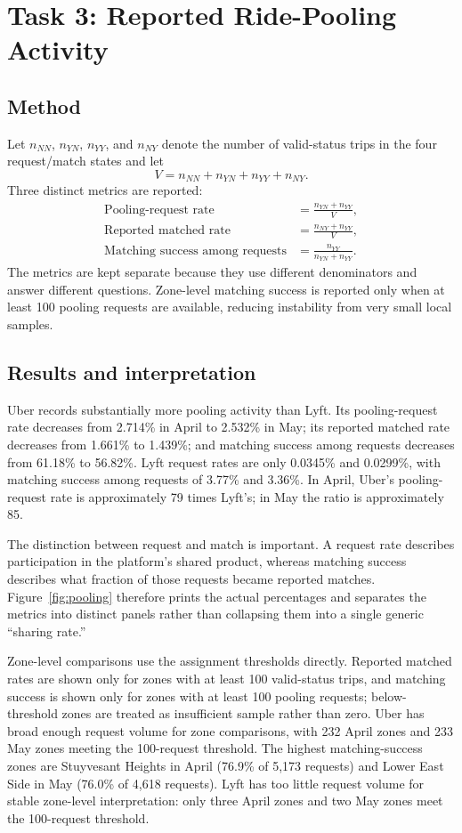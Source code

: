 \documentclass[10pt,a4paper]{article}
\begin{document}
\section{Task 3: Reported Ride-Pooling Activity}
\subsection{Method}
Let $n_{NN}$, $n_{YN}$, $n_{YY}$, and $n_{NY}$ denote the number of valid-status trips in the four request/match states and let
\[
V=n_{NN}+n_{YN}+n_{YY}+n_{NY}.
\]
Three distinct metrics are reported:
\begin{align}
\text{Pooling-request rate} &= \frac{n_{YN}+n_{YY}}{V},\\
\text{Reported matched rate} &= \frac{n_{NY}+n_{YY}}{V},\\
\text{Matching success among requests} &= \frac{n_{YY}}{n_{YN}+n_{YY}}.
\end{align}
The metrics are kept separate because they use different denominators and answer different questions. Zone-level matching success is reported only when at least 100 pooling requests are available, reducing instability from very small local samples.

\subsection{Results and interpretation}
Uber records substantially more pooling activity than Lyft. Its pooling-request rate decreases from 2.714\% in April to 2.532\% in May; its reported matched rate decreases from 1.661\% to 1.439\%; and matching success among requests decreases from 61.18\% to 56.82\%. Lyft request rates are only 0.0345\% and 0.0299\%, with matching success among requests of 3.77\% and 3.36\%. In April, Uber's pooling-request rate is approximately 79 times Lyft's; in May the ratio is approximately 85.

The distinction between request and match is important. A request rate describes participation in the platform's shared product, whereas matching success describes what fraction of those requests became reported matches. Figure~\ref{fig:pooling} therefore prints the actual percentages and separates the metrics into distinct panels rather than collapsing them into a single generic ``sharing rate.''

Zone-level comparisons use the assignment thresholds directly. Reported matched rates are shown only for zones with at least 100 valid-status trips, and matching success is shown only for zones with at least 100 pooling requests; below-threshold zones are treated as insufficient sample rather than zero. Uber has broad enough request volume for zone comparisons, with 232 April zones and 233 May zones meeting the 100-request threshold. The highest matching-success zones are Stuyvesant Heights in April (76.9\% of 5,173 requests) and Lower East Side in May (76.0\% of 4,618 requests). Lyft has too little request volume for stable zone-level interpretation: only three April zones and two May zones meet the 100-request threshold.
\end{document}
